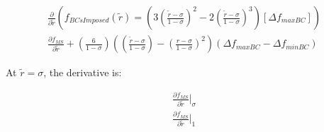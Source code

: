 \begin{align*}
    \frac{\partial}{\partial \widetilde{r}}\left(  f_{BCsImposed}(\widetilde{r}) =
    \left(
        3 \left(  \frac{\widetilde{r} - \sigma }{ 1 - \sigma}\right)^2- 
        2 \left( \frac{\widetilde{r} - \sigma}{1 - \sigma} \right)^3 
    \right)
    \left[ \Delta f_{maxBC} \right]\right) \\
    \frac{\partial f_{MS}}{\partial \widetilde{r}} + 
    \left( \frac{6}{1-\sigma} \right)
    \left( 
        \left( \frac{\widetilde{r} - \sigma}{1 - \sigma} \right) -
    \left( \frac{r - \sigma}{1 - \sigma} \right)^2 \right)
    \left( \Delta f_{maxBC} - \Delta f_{minBC} \right)
\end{align*} 


At $\widetilde{r} = \sigma$, the derivative is: 

\begin{align*}
    \frac{\partial f_{MS}}{\partial \widetilde{r}}|_{\sigma} \\
    \frac{\partial f_{MS}}{\partial \widetilde{r}}|_{1} 
\end{align*}

